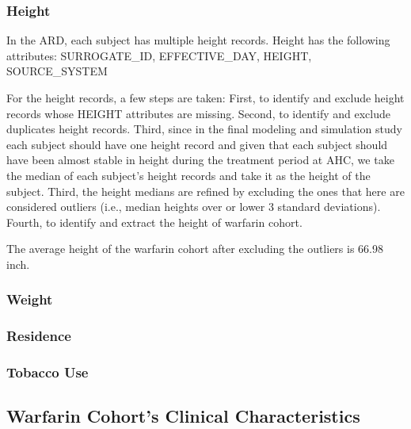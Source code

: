 \documentclass{article}
\begin{document}
\subsubsection{Height}
In the ARD, each subject has multiple height records. Height has the following attributes:
SURROGATE\_ID, EFFECTIVE\_DAY, HEIGHT, SOURCE\_SYSTEM

For the height records, a few steps are taken:
First, to identify and exclude height records whose HEIGHT attributes are missing.
Second, to identify and exclude duplicates height records.
Third, since in the final modeling and simulation study each subject should have one height record and given that each subject should have been almost stable in height during the treatment period at AHC, we take the median of each subject's height records and take it as the height of the subject. Third, the height medians are refined by excluding the ones that here are considered outliers (i.e., median heights over or lower 3 standard deviations). 
Fourth, to identify and extract the height of warfarin cohort.
 

The average height of the warfarin cohort after excluding the outliers is 66.98 inch.



\subsubsection{Weight}


\subsubsection{Residence}


\subsubsection{Tobacco Use}


\subsection{Warfarin Cohort's Clinical Characteristics}
\end{document}
